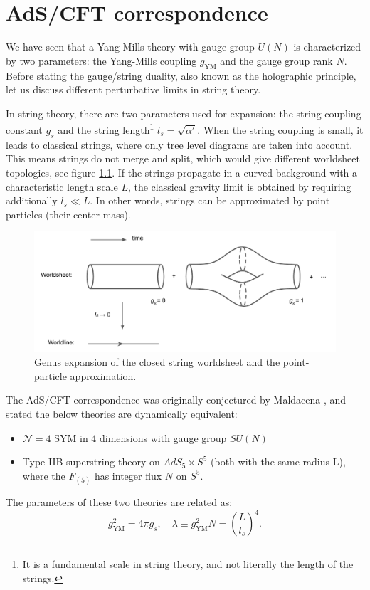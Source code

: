 \chapter{AdS/CFT correspondence}\label{chp:AdSCFT}


We have seen that a Yang-Mills theory with gauge group $U(N)$ is characterized by two parameters: 
the Yang-Mills coupling $g_\text{YM}$ and the gauge group rank $N$.
Before stating the gauge/string duality, also known as the holographic principle, 
let us discuss different perturbative limits in string theory.

In string theory, there are two parameters used for expansion: 
the string coupling constant $g_s$ and the string length\footnote{
It is a fundamental scale in string theory, and not literally the length of the strings.} $l_s = \sqrt{\alpha'}$.
When the string coupling is small, it leads to classical strings,
where only tree level diagrams are taken into account.
This means strings do not merge and split, 
which would give different worldsheet topologies, see figure \ref{fig:stringPerturbation}.
If the strings propagate in a curved background with a characteristic length scale $L$,
the classical gravity limit is obtained by requiring additionally $l_s \ll L$.
In other words, strings can be approximated by point particles (their center mass). 

\begin{figure}[t]
\begin{center}
\includegraphics[width=\textwidth]{Images/stringPerturbation.pdf}
\end{center}
\caption{\label{fig:stringPerturbation} Genus expansion of the closed string worldsheet and the point-particle approximation.}
\end{figure}


The AdS/CFT correspondence was originally conjectured by Maldacena \cite{Maldacena:1997re}, 
and stated the below theories are dynamically equivalent:
\begin{itemize}
 \item $\mathcal{N}= 4$ SYM in 4 dimensions with gauge group $SU(N)$
 \item Type IIB superstring theory on $AdS_5 \times S^5$ (both with the same radius L), 
       where the $F_{(5)}$ has integer flux $N$ on $S^5$.
\end{itemize}
The parameters of these two theories are related as:
\begin{equation}\label{couplings}
 g_\text{YM}^2 = 4 \pi g_s, \quad  \lambda \equiv g_\text{YM}^2 N = \left(\dfrac{L}{l_s}\right)^4.
\end{equation}

